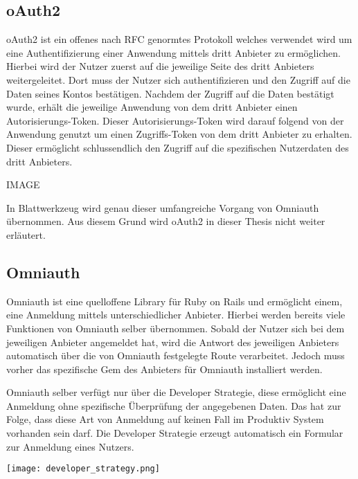 \documentclass[11pt]{article}
\begin{document}
\begin{flushleft}
			\subsection{oAuth2}
			\label{sec: oauth}
			oAuth2 ist ein offenes nach RFC genormtes Protokoll welches verwendet wird um eine Authentifizierung einer Anwendung mittels dritt Anbieter zu ermöglichen. Hierbei wird der Nutzer zuerst auf die jeweilige Seite des dritt Anbieters weitergeleitet. Dort muss der Nutzer sich authentifizieren und den Zugriff auf die Daten seines Kontos bestätigen. Nachdem der Zugriff auf die Daten bestätigt wurde, erhält die jeweilige Anwendung von dem dritt Anbieter einen Autorisierungs-Token. Dieser Autorisierungs-Token wird darauf folgend von der Anwendung genutzt um einen Zugriffs-Token von dem dritt Anbieter zu erhalten. Dieser ermöglicht schlussendlich den Zugriff auf die spezifischen Nutzerdaten des dritt Anbieters.\par\bigskip
			
			IMAGE\par\bigskip
			
			In Blattwerkzeug wird genau dieser umfangreiche Vorgang von Omniauth übernommen. Aus diesem Grund wird oAuth2 in dieser Thesis nicht weiter erläutert.
			
			\subsection{Omniauth}
			\label{sec: omniauth}
			Omniauth ist eine quelloffene Library für Ruby on Rails und ermöglicht einem, eine Anmeldung mittels unterschiedlicher Anbieter. Hierbei werden bereits viele Funktionen von Omniauth selber übernommen. Sobald der Nutzer sich bei dem jeweiligen Anbieter angemeldet hat, wird die Antwort des jeweiligen Anbieters automatisch über die von Omniauth festgelegte Route verarbeitet. Jedoch muss vorher das spezifische Gem des Anbieters für Omniauth installiert werden.\par\bigskip
			
			Omniauth selber verfügt nur über die Developer Strategie, diese ermöglicht eine Anmeldung ohne spezifische Überprüfung der angegebenen Daten. Das hat zur Folge, dass diese Art von Anmeldung auf keinen Fall im Produktiv System vorhanden sein darf. Die Developer Strategie erzeugt automatisch ein Formular zur Anmeldung eines Nutzers.
			
			\begin{center}
				\texttt{[image: developer\_strategy.png]}
			\end{center}
		

\end{flushleft}
\end{document}

